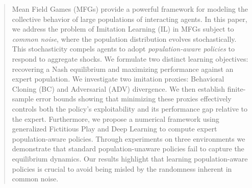 \documentclass{article}
\theoremstyle{plain}
\begin{document}
\begin{abstract}




Mean Field Games (MFGs) provide a powerful framework for modeling the collective behavior of large populations of interacting agents. In this paper, we address the problem of Imitation Learning (IL) in MFGs subject to \emph{common noise}, where the population distribution evolves stochastically. This stochasticity compels agents to adopt \emph{population-aware policies} to respond to aggregate shocks. We formulate two distinct learning objectives: recovering a Nash equilibrium and maximizing performance against an expert population. We investigate two imitation proxies: Behavioral Cloning (BC) and Adversarial (ADV) divergence. We then establish finite-sample error bounds showing that minimizing these proxies effectively controls both the policy's exploitability and its performance gap relative to the expert. 
Furthermore, we propose a numerical framework using generalized Fictitious Play and Deep Learning to compute expert population-aware policies. Through experiments on three environments %
we demonstrate that standard population-unaware policies fail to capture the equilibrium dynamics. Our results highlight that learning population-aware policies is crucial to avoid being misled by the randomness inherent in common noise.


\end{abstract}
\end{document}
